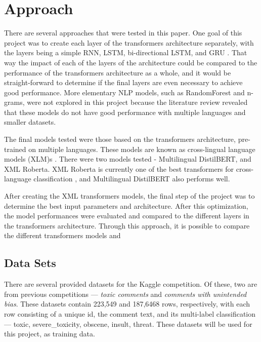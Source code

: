\documentclass{article}
\begin{document}
\section{Approach}

There are several approaches that were tested in this paper. One goal of this project was to create each layer of the transformers architecture separately, with the layers being a simple RNN, LSTM, bi-directional LSTM, and GRU \cite{lample2019crosslingual}. That way the impact of each of the layers of the architecture could be compared to the performance of the transformers architecture as a whole, and it would be straight-forward to determine if the final layers are even necessary to achieve good performance. More elementary NLP models, such as RandomForest and n-grams, were not explored in this project because the literature review revealed that these models do not have good performance with multiple languages and smaller datasets.

The final models tested were those based on the transformers architecture, pre-trained on multiple languages. These models are known as cross-lingual language models (XLM)s \cite{lample2019crosslingual}. There were two models tested - Multilingual DistilBERT, and XML Roberta. XML Roberta is currently one of the best transformers for cross-language classification \cite{deep_learning_approaches}, and Multilingual DistilBERT also performs well.

After creating the XML transformers models, the final step of the project was to determine the best input parameters and architecture. After this optimization, the model performances were evaluated and compared to the different layers in the transformers architecture. Through this approach, it is possible to compare the different transformers models and 

\subsection{Data Sets}

There are several provided datasets for the Kaggle competition. Of these, two are from previous competitions --- \textit{toxic comments} and \textit{comments with unintended bias}. These datasets contain 223,549 and 187,6468 rows, respectively, with each row consisting of a unique id, the comment text, and its multi-label classification --- toxic, severe\_toxicity, obscene, insult, threat. These datasets will be used for this project, as training data.
\end{document}
